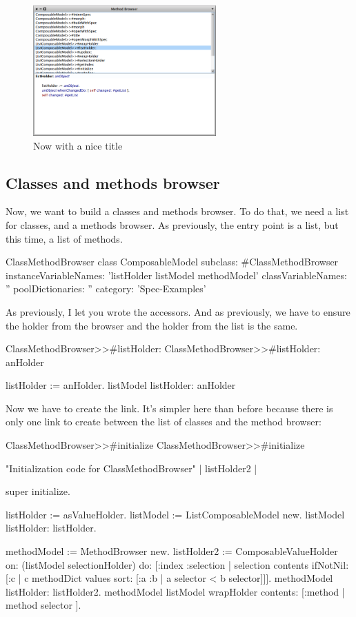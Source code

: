 \documentclass[a4paper,10pt,twoside]{book}
\begin{document}
\begin{figure}[ht]
\begin{center}
	\includegraphics[width=7cm]{MethodBrowser4}
	\caption{Now with a nice title}
\end{center}
\end{figure}

\subsection{Classes and methods browser}

Now, we want to build a classes and methods browser. To do that, we need a list for classes, and a methods browser. As previously, the entry point is a list, but this time, a list of methods.

\begin{classdef}{ClassMethodBrowser class}
ComposableModel subclass: #ClassMethodBrowser
	instanceVariableNames: 'listHolder listModel methodModel'
	classVariableNames: ''
	poolDictionaries: ''
	category: 'Spec-Examples'
\end{classdef}

As previously, I let you wrote the accessors. And as previously, we have to ensure the holder from the browser and the holder from the list is the same.

\begin{method}{ClassMethodBrowser>>\#listHolder:}
ClassMethodBrowser>>#listHolder: anHolder
	
	listHolder := anHolder.
	listModel listHolder: anHolder
\end{method}

Now we have to create the link. It's simpler here than before because there is only one link to create between the list of classes and the method browser:

\begin{method}{ClassMethodBrowser>>\#initialize}
ClassMethodBrowser>>#initialize

	"Initialization code for ClassMethodBrowser"
	| listHolder2 |
	
	super initialize.
	
	listHolder := {} asValueHolder.
	listModel := ListComposableModel new.
	listModel listHolder: listHolder.
	
	methodModel := MethodBrowser new.
	listHolder2 := ComposableValueHolder on: (listModel selectionHolder) do: [:index :selection | selection contents ifNotNil: [:c | c methodDict values sort: [:a :b | a selector < b selector]]].
	methodModel listHolder: listHolder2.
	methodModel listModel wrapHolder contents: [:method | method selector ].
\end{method}
\end{document}
